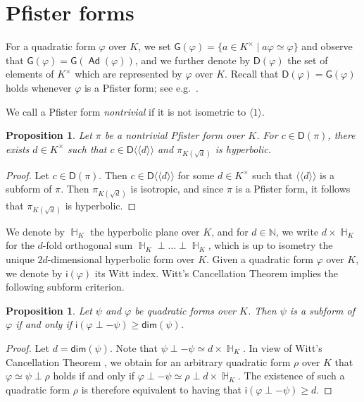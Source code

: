 \documentclass[twoside,11pt]{amsart}
\numberwithin{equation}{section}
\newtheorem{prop}[equation]{Proposition}
\theoremstyle{definition}
\renewcommand{\dim}{\mathsf{dim}}
\newcommand\hh{\operatorname{\mathbb{H}}}
\newcommand{\vf}{\varphi}
\newcommand{\mg}[1]{{#1}^{\times}}
\newcommand{\nat}{\mathbb{N}}
\newcommand{\la}{\langle}
\newcommand{\ra}{\rangle}
\newcommand{\lla}{\la\!\la}
\newcommand{\rra}{\ra\!\ra}
\renewcommand{\geq}{\geqslant}
\newcommand\Ad{\operatorname{\mathsf{Ad}}}
\newcommand{\G}{\mathsf{G}}
\newcommand{\D}{\mathsf{D}}
\newcommand{\wi}{\mathsf{i}}
\begin{document}
\section{Pfister forms}
\label{S:Pfister}

For a quadratic form $\vf$ over $K$, we set $\G(\vf)=\{a\in\mg{K}\mid a\vf\simeq\vf\}$ and observe that $\G(\vf)=\G(\Ad(\vf))$, and we further denote by $\D(\vf)$ the set of elements of $\mg{K}$ which are represented by $\vf$ over $K$.
Recall that $\D(\vf)=\G(\vf)$ holds whenever $\vf$ is a Pfister form; see e.g.~\cite[Chap.~X, Theorem 1.8]{Lam05}.

We call a Pfister form \emph{nontrivial} if it is not isometric to $\la 1\ra$.

\begin{prop}\label{Pfisterform}
    Let $\pi$ be a nontrivial Pfister form over $K$.
    For $c\in\D(\pi)$, there exists $d\in\mg{K}$ such that $c\in\D\lla d\rra$ and $\pi_{K(\sqrt{d})}$ is hyperbolic.
\end{prop}
\begin{proof}
Let $c\in\D(\pi)$.  
Then $c\in\D\lla d\rra$ for some $d\in\mg{K}$ such that $\lla d\rra$ is a subform of $\pi$.
Then $\pi_{K(\sqrt{d})}$ is isotropic, and since $\pi$ is a Pfister form, it follows that $\pi_{K(\sqrt{d})}$ is hyperbolic. 
\end{proof}

We denote by $\hh_K$ the hyperbolic plane over $K$, and for $d\in\nat$, we write $d\times\hh_K$ for the $d$-fold orthogonal sum $\hh_K\perp\ldots\perp\hh_K$, 
which is up to isometry the unique $2d$-dimensional hyperbolic form over $K$.
Given a quadratic form $\vf$ over $K$, we denote by $\wi(\vf)$ its Witt index. Witt's Cancellation Theorem \cite[Theorem 8.4]{EKM08}
implies the following subform criterion.

\begin{prop}\label{subform}
    Let $\psi$ and $\vf$ be quadratic forms over $K$.
    Then $\psi$ is a subform of $\vf$ if and only if $\wi(\vf\perp-\psi)\geq \dim(\psi)$.
\end{prop}
\begin{proof}
    Let $d=\dim(\psi)$. Note that $\psi\perp-\psi\simeq d\times\hh_K$.
    In view of Witt's Cancellation Theorem \cite[Theorem 8.4]{EKM08}, we obtain for an arbitrary quadratic form $\rho$ over $K$ that 
    $\vf\simeq \psi\perp\rho$ holds if and only if $\vf\perp-\psi\simeq \rho\perp d\times\hh_K$.
    The existence of such a quadratic form $\rho$ is therefore equivalent to having that $\wi(\vf\perp-\psi)\geq d$.
\end{proof}
\end{document}
